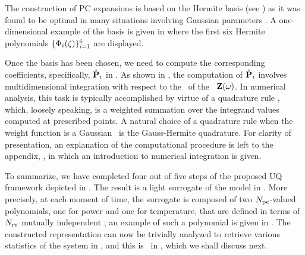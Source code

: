 The construction of PC expansions is based on the Hermite basis (see ) as it was found to be optimal in many situations involving Gaussian parameters \cite{xiu2002}. A one-dimensional example of the basis is given in  where the first six Hermite polynomials $\{ \Phi_i(\zeta) \}_{i = 1}^6$ are displayed.

Once the basis has been chosen, we need to compute the corresponding coefficients, specifically, $\hat{\mathbf{P}}_i$ in . As shown in , the computation of $\hat{\mathbf{P}}_i$ involves multidimensional integration with respect to the \pdf\ of the \rvs\ $\mathbf{Z}(\omega)$. In numerical analysis, this task is typically accomplished by virtue of a quadrature rule \cite{press2007}, which, loosely speaking, is a weighted summation over the integrand values computed at prescribed points. A natural choice of a quadrature rule when the weight function is a Gaussian \pdf\ is the Gauss-Hermite quadrature. For clarity of presentation, an explanation of the computational procedure is left to the appendix, , in which an introduction to numerical integration is given.

To summarize, we have completed four out of five steps of the proposed UQ framework depicted in . The result is a light surrogate of the model in . More precisely, at each moment of time, the surrogate is composed of two ${N_\text{pe}}$-valued polynomials, one for power and one for temperature, that are defined in terms of ${N_\text{rv}}$ mutually independent \rvs; an example of such a polynomial is given in . The constructed representation can now be trivially analyzed to retrieve various statistics of the system in , and this is \ in , which we shall discuss next.
